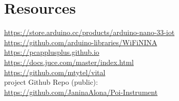 \newpage
\section{Resources}

\url{https://store.arduino.cc/products/arduino-nano-33-iot} \\
\url{https://github.com/arduino-libraries/WiFiNINA} \\ 
\url{https://pcapplusplus.github.io} \\
\url{https://docs.juce.com/master/index.html} \\
\url{https://github.com/mtytel/vital} \\

project Github Repo (public): \\
\url{https://github.com/JaninaAlona/Poi-Instrument} \\ \\



